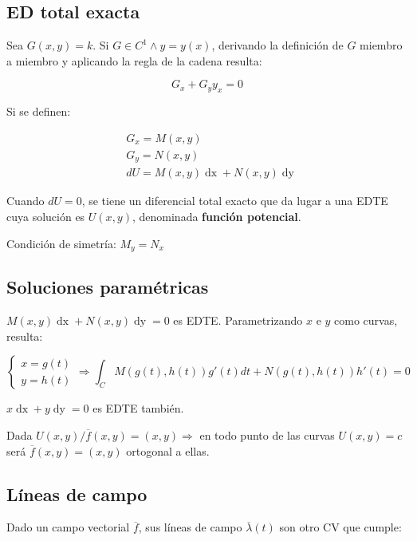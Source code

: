 \documentclass{article}
\begin{document}
\subsection{ED total exacta}

Sea $G(x,y) = k$. Si $G \in C^1 \wedge y = y(x)$, derivando la definición de $G$ miembro a miembro y aplicando la regla de la cadena resulta:

\begin{equation}
G_x + G_y y_x = 0
\end{equation}

Si se definen:

\begin{align}
& G_x = M(x,y) \\
& G_y = N(x,y) \\
& dU = M(x,y) \mathop{dx} + N(x,y) \mathop{dy}
\end{align}

Cuando $dU = 0$, se tiene un diferencial total exacto que da lugar a una EDTE cuya solución es $U(x,y)$, denominada \textbf{función potencial}.

Condición de simetría: $M_y = N_x$

\subsection{Soluciones paramétricas}

$M(x,y) \mathop{dx} + N(x,y) \mathop{dy} = 0$ es EDTE. Parametrizando $x$ e $y$ como curvas, resulta:

\begin{equation}
\left\{
\begin{array}{ll}
x = g(t) \\
y = h(t)
\end{array}
\right. \Rightarrow \int_C M(g(t), h(t)) g'(t) dt + N(g(t), h(t)) h'(t) = 0
\end{equation}

$x \mathop{dx} + y \mathop{dy} = 0$ es EDTE también.

Dada $U(x,y) / \overline{f}(x,y) = (x,y) \Rightarrow$ en todo punto de las curvas $U(x,y) = c$ será $\overline{f}(x,y) = (x,y)$ ortogonal a ellas.

\subsection{Líneas de campo}

Dado un campo vectorial $\overline{f}$, sus líneas de campo $\overline{\lambda}(t)$ son otro CV que cumple:
\end{document}
